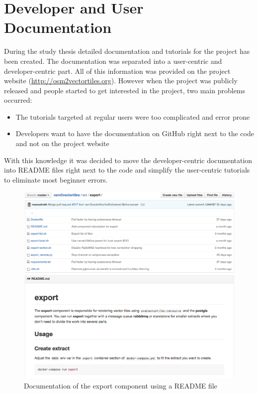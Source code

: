 \chapter{Developer and User Documentation}

During the study thesis detailed documentation and tutorials for the \osmvt{} project has been created. The documentation was separated into a user-centric and developer-centric part.
All of this information was provided on the project website (\url{http://osm2vectortiles.org}). However when the project was publicly released and people started to get interested in the project, two main problems occurred:

\begin{itemize}
    \item The tutorials targeted at regular users were too complicated and error prone
    \item Developers want to have the documentation on GitHub right next to the code and not on the project website
\end{itemize}

With this knowledge it was decided to move the developer-centric documentation into README files right next to the code and simplify the user-centric tutorials to eliminate most beginner errors.

\begin{figure}[H]
  \centering
  \includegraphics[width=1.0\textwidth]{images/documentation/developer_documentation}
  \caption{Documentation of the export component using a README file}
  \label{developer_documentation}
\end{figure}

